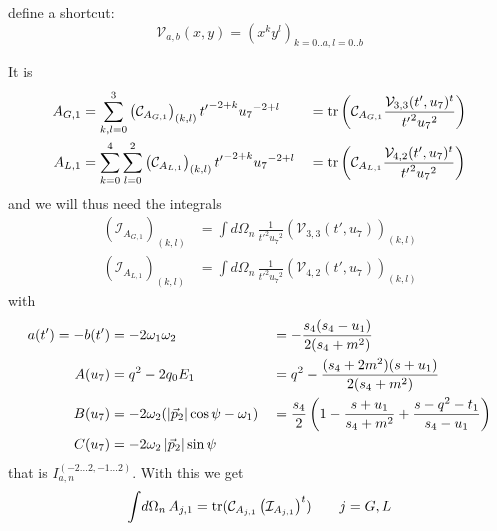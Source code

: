 define a shortcut:
\begin{equation}
\mathcal V_{a,b}(x,y) = \left(x^{k} y^{l}\right)_{k=0..a,l=0..b}
\end{equation}

It is
\begin{align}
A_{G,1} &= \sum_{k,l=0}^{3} \left(\mathcal C_{A_{G,1}}\right)_{(k,l)} {t'}^{-2+k} {u_7}^{-2+l} &&= \operatorname{\text{tr}}\left(\mathcal C_{A_{G,1}} \frac{\mathcal V_{3,3}(t',u_7)^t}{{t'}^2{u_7}^2}\right)\\
A_{L,1} &= \sum_{k=0}^{4}\sum_{l=0}^{2} \left(\mathcal C_{A_{L,1}}\right)_{(k,l)} {t'}^{-2+k} {u_7}^{-2+l} &&= \operatorname{\text{tr}}\left(\mathcal C_{A_{L,1}} \frac{\mathcal V_{4,2}(t',u_7)^t}{{t'}^2{u_7}^2}\right)
\end{align}
and we will thus need the integrals
\begin{align}
\left(\mathcal I_{A_{G,1}}\right)_{(k,l)} &= \int\!d\Omega_n\,\frac 1 {{t'}^2{u_7}^2}\left(\mathcal V_{3,3}(t',u_7)\right)_{(k,l)}\\
\left(\mathcal I_{A_{L,1}}\right)_{(k,l)} &= \int\!d\Omega_n\,\frac 1 {{t'}^2{u_7}^2}\left(\mathcal V_{4,2}(t',u_7)\right)_{(k,l)}
\end{align}
with
\begin{align}
a(t') = -b(t') &= -2\omega_1\omega_2 &&= -\frac{s_4(s_4-u_1)}{2(s_4+m^2)}\\
A(u_7) &= q^2-2q_0E_1 &&= q^2-\frac{(s_4+2m^2)(s+u_1)}{2(s_4+m^2)}\\
B(u_7) &= -2\omega_2(\left|\vec p_2\right|\cos\psi-\omega_1) &&=\frac {s_4}{2}\left(1-\frac{s+u_1}{s_4+m^2}+\frac{s-q^2-t_1}{s_4-u_1}\right)\\
C(u_7) &= -2\omega_2\left|\vec p_2\right|\sin\psi
\end{align}
that is $I_{a,n}^{(-2\ldots 2,-1\ldots 2)}$. With this we get
\begin{equation}
\int\!d\Omega_n\,A_{j,1} = \operatorname{\text{tr}}(\mathcal C_{A_{j,1}} \left(\mathcal I_{A_{j,1}}\right)^t) \qquad j=G,L
\end{equation}

